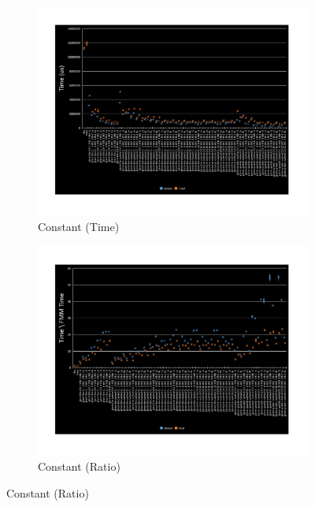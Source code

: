 \documentclass[11pt]{article}       %
\begin{document}
\begin{figure}%
	\centering
	\begin{subfigure}[b]{.4\columnwidth}
		\includegraphics[width=\textwidth]{Figures/time-constant}
		\caption{Constant (Time)}
	\end{subfigure}
	\begin{subfigure}[b]{.4\columnwidth}
		\includegraphics[width=\textwidth]{Figures/ratio-time-constant}
		\caption{Constant (Ratio)}
	\end{subfigure}


\end{figure}
\end{document}
